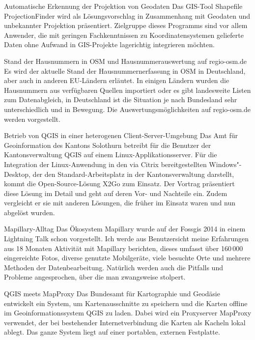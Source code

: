 %
{Automatische Erkennung der Projektion von Geodaten}%
{}%
{Das GIS-Tool Shapefile ProjectionFinder wird als Lösungsvorschlag
in Zusammenhang mit Geodaten und
unbekannter Projektion präsentiert. Zielgruppe dieses Programms sind vor
allem Anwender, die mit geringen
Fachkenntnissen zu Koordinatensystemen gelieferte Daten ohne Aufwand in
GIS-Projekte lagerichtig integrieren möchten.}

%
{Stand der Hausnummern in OSM und Hausnummerauswertung auf regio-osm.de}%
{}%
{Es wird der aktuelle Stand der Hausnummernerfassung in OSM in Deutschland, aber auch in anderen EU-Ländern erläutet.
In einigen Ländern wurden die Hausnummern aus verfügbaren Quellen importiert
oder es gibt landesweite Listen zum Datenabgleich, in Deutschland ist die
Situation je nach Bundesland sehr unterschiedlich und in Bewegung.
Die Auswertungsmöglichkeiten auf regio-osm.de werden vorgestellt.}


%
{Betrieb von QGIS in einer hete\-rogenen Client-Server-Umgebung}%
{}%
{Das Amt für Geoinformation des Kantons Solothurn betreibt für die Benutzer der
Kantonsverwaltung QGIS auf einem Linux-Applikationsserver. Für die Integration
der Linux-Anwendung in den via Citrix bereitgestellten Windows"-Desktop, der den
Standard-Arbeitsplatz in der Kantonsverwaltung darstellt, kommt die Open-Source-Lösung X2Go zum Einsatz.
Der Vortrag präsentiert diese Lösung im Detail und geht auf deren Vor- und
Nachteile ein. Zudem vergleicht er sie mit anderen Lösungen, die früher im Einsatz waren und nun abgelöst wurden.}

%
{Mapillary-Alltag}%
{}%
{Das Ökosystem Mapillary wurde auf der Fossgis 2014 in einem Lightning
Talk schon vorgestellt.
Ich werde aus Benutzersicht meine Erfahrungen aus 18 Monaten Aktivität mit
Mapillary berichten, dieses umfasst über 160\,000 eingereichte Fotos,
diverse genutzte Mobilgeräte, viele besuchte Orte und mehrere Methoden
der Datenbearbeitung. Natürlich werden auch die Pitfalls und Probleme angesprochen, über die
man zwangsweise stolpert.}


%
{QGIS meets MapProxy}%
{}%
{Das Bundesamt für Kartographie und Geodäsie entwickelt ein System, um Kartenausschnitte zu speichern und
die Karten offline im Geoinformationssystem QGIS zu laden. Dabei wird ein
Proxyserver MapProxy verwendet, der bei bestehender Internetverbindung
die Karten als Kacheln lokal ablegt. Das ganze System liegt auf einer
portablen, externen Festplatte.}

